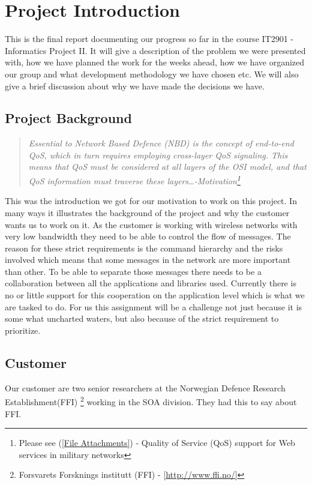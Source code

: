 \section{Project Introduction}\label{Project Introduction}
    This is the final report documenting our progress so far in the course IT2901 - Informatics Project II. It will give a description of the problem we were presented with, how we have planned the work for the weeks ahead, how we have organized our group and what development methodology we have chosen etc. We will also give a brief discussion about why we have made the decisions we have.
    
    \subsection{Project Background}\label{Project Background}
    \begin{quotation}
    \em Essential to Network Based Defence (NBD) is the concept of end-to-end QoS, which in turn requires employing cross-layer QoS signaling. This means that QoS must be considered at all layers of the OSI model, and that QoS information must traverse these layers\ldots \textnormal{-Motivation\footnote{Please see (\ref{File Attachments}) - Quality of Service (QoS) support for Web services in military networks}}
    \end{quotation}
    This was the introduction we got for our motivation to work on this project. In many ways it illustrates the background of the project and why the customer wants us to work on it. As the customer is working with wireless networks with very low bandwidth they need to be able to control the flow of messages. The reason for these strict requirements is the command hierarchy and the risks involved which means that some messages in the network are more important than other. To be able to separate those messages there needs to be a collaboration between all the applications and libraries used. Currently there is no or little support for this cooperation on the application level which is what we are tasked to do. For us this assignment will be a challenge not just because it is some what uncharted waters, but also because of the strict requirement to prioritize.

    \subsection{Customer}\label{Customer}
    Our customer are two senior researchers at the Norwegian Defence Research Establishment(FFI)    \footnote{Forsvarets Forsknings institutt (FFI) - [\url{http://www.ffi.no/}]} working in the SOA division. They had this to say about FFI.

